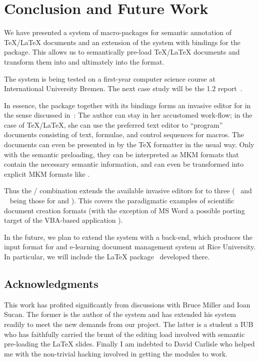 \section{Conclusion and Future Work}\label{sec:concl}

We have presented a system {\stex} of macro-packages for semantic annotation of
{\TeX/\LaTeX} documents and an extension of the {\latexml} system with bindings
for the {\stex} package. This allows us to semantically pre-load {\TeX/\LaTeX}
documents and transform them into {\xml} and ultimately into the {\omdoc} format.

The system is being tested on a first-year computer science course at
International University Bremen. The next case study will be the {\omdoc} 1.2
report~\cite{Kohlhase:omdoc1.2}.

In essence, the {\stex} package together with its {\latexml} bindings forms an
invasive editor for {\omdoc} in the sense discussed in~\cite{KohKoh:cdad04}: The
author can stay in her accustomed work-flow; in the case of {\TeX/\LaTeX}, she can
use the preferred text editor to ``program'' documents consisting of text,
formulae, and control sequences for macros. The documents can even be presented in
by the {\TeX} formatter in the usual way. Only with the semantic preloading, they
can be interpreted as MKM formats that contain the necessary semantic information,
and can even be transformed into explicit MKM formats like {\omdoc}.

Thus the {\stex}/{\latexml} combination extends the available invasive editors
for {\omdoc} to three ({\cpoint}~\cite{KohKoh:cdad04} and
{}~\cite{Sutner:cmnto04} being those for {\ppt} and {\mathematica}).
This covers the paradigmatic examples of scientific document creation formats
(with the exception of MS Word a possible porting target of the VBA-based
application {\cpoint}).

In the future, we plan to extend the system with a {\cnxml} back-end, which
produces the input format for {\connexions} and e-learning document management
system at Rice University. In particular, we will include the {\LaTeX}
package~\cite{WillHenBar:clsfflc03} developed there.


\subsection*{Acknowledgments} This work has profited significantly from
discussions with Bruce Miller and Ioan Sucan. The former is the author of the
{\latexml} system and has extended his system readily to meet the new demands from
our project. The latter is a student a IUB who has faithfully carried the brunt of
the editing load involved with semantic pre-loading the {\LaTeX} slides. Finally I
am indebted to David Carlisle who helped me with the non-trivial hacking involved
in getting the modules to work.


